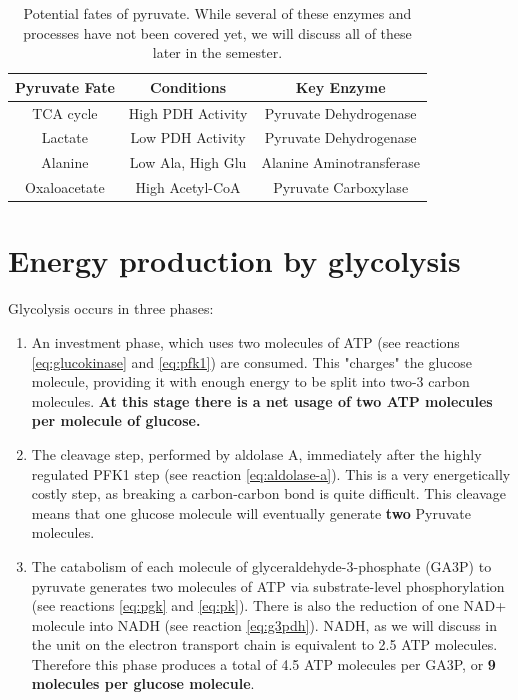\documentclass{tufte-handout}
\begin{document}
\begin{table}
\centering
\caption{Potential fates of pyruvate.  While several of these enzymes and processes have not been covered yet, we will discuss all of these later in the semester.}
\label{tab:pyruvate-fates}
\begin{tabular}{ccc}
\hline
\textbf {Pyruvate Fate} & \textbf{Conditions}  & \textbf{Key Enzyme} \\
\hline
TCA cycle & High PDH Activity & Pyruvate Dehydrogenase \\
Lactate & Low PDH Activity & Pyruvate Dehydrogenase \\
Alanine & Low Ala, High Glu & Alanine Aminotransferase\\
Oxaloacetate & High Acetyl-CoA & Pyruvate Carboxylase \\
\hline
\end{tabular}
\end{table}

\section{Energy production by glycolysis}

Glycolysis occurs in three phases:

\begin{enumerate}
\item An investment phase, which uses two molecules of ATP (see reactions \ref{eq:glucokinase} and \ref{eq:pfk1}) are consumed.  This "charges" the glucose molecule, providing it with enough energy to be split into two-3 carbon molecules.  \textbf{At this stage there is a net usage of two ATP molecules per molecule of glucose.}
\item The cleavage step, performed by aldolase A, immediately after the highly regulated PFK1 step (see reaction \ref{eq:aldolase-a}).  This is a very energetically costly step, as breaking a carbon-carbon bond is quite difficult.  This cleavage means that one glucose molecule will eventually generate \textbf{two} Pyruvate molecules.
\item The catabolism of each molecule of glyceraldehyde-3-phosphate (GA3P) to pyruvate generates two molecules of ATP via substrate-level phosphorylation (see reactions \ref{eq:pgk} and \ref{eq:pk}).  There is also the reduction of one NAD+ molecule into NADH (see reaction \ref{eq:g3pdh}).  NADH, as we will discuss in the unit on the electron transport chain is equivalent to 2.5 ATP molecules.  Therefore this phase produces a total of 4.5 ATP molecules per GA3P, or \textbf{9 molecules per glucose molecule}.
\end{enumerate}
\end{document}
